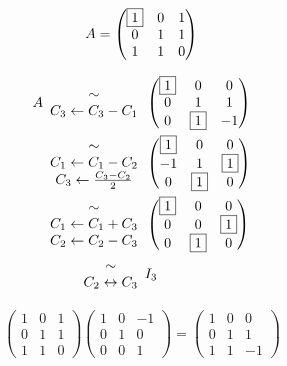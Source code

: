 \begin{exm}
	\[
		A = \begin{pmatrix}
			\fbox{$1$}&0&1\\
			0&1&1\\
			1&1&0
		\end{pmatrix} 
	\]

	\begin{align*}
		A
		\begin{array}{c}
			\sim\\
			C_3 \leftarrow C_3 - C_1
		\end{array}
		&
		\begin{pmatrix}
			\fbox{$1$} & 0 & 0\\
			0&1&1\\
			0&\fbox{$1$}&-1
		\end{pmatrix}\\
		\begin{array}{c}
			\sim\\
			C_1 \leftarrow C_1 - C_2\\
			C_3 \leftarrow \frac{C_3 - C_2}{2}
		\end{array}&
		\begin{pmatrix}
			\fbox{$1$}&0&0\\
			-1&1&\fbox{$1$}\\
			0&\fbox{$1$} & 0
		\end{pmatrix}\\
		\begin{array}{c}
			\sim\\
			C_1\leftarrow C_1 + C_3\\
			C_2 \leftarrow C_2 - C_3
		\end{array}&
		\begin{pmatrix}
			\fbox{$1$} & 0&0\\
			0&0&\fbox{$1$}\\
			0&\fbox{$1$}&0
		\end{pmatrix}\\
		\begin{array}{c}
			\sim\\
			C_2 \leftrightarrow C_3
		\end{array} & I_3
	\end{align*}

	\begin{align*}
		\begin{pmatrix}
			1&0&1\\
			0&1&1\\
			1&1&0
		\end{pmatrix}
		\begin{pmatrix}
			1&0&-1\\
			0&1&0\\
			0&0&1
		\end{pmatrix} = \begin{pmatrix}
			1&0&0\\
			0&1&1\\
			1&1&-1
		\end{pmatrix}
	\end{align*}


\end{exm}
